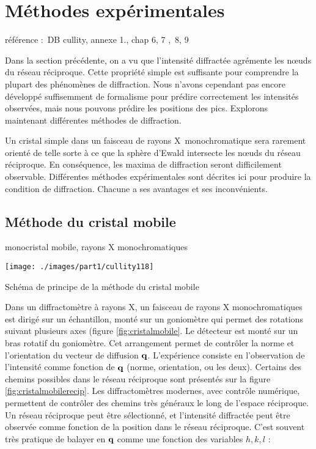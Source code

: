 \chapter{Méthodes expérimentales}

référence : DB cullity, annexe 1., chap 6, 7 , 8, 9

Dans la section précédente, on a vu que l'intensité diffractée agrémente les nœuds du réseau réciproque. Cette propriété simple est suffisante pour comprendre la plupart des phénomènes de diffraction.
Nous n'avons cependant pas encore développé suffisemment de formalisme pour prédire correctement les intensités observées, mais nous pouvons prédire les positions des pics. Explorons maintenant différentes méthodes de diffraction.

Un cristal simple dans un faisceau de rayons X monochromatique sera rarement orienté de telle sorte à ce que la sphère d'Ewald intersecte les nœuds du réseau réciproque. En conséquence, les maxima de diffraction seront difficilement observable. Différentes méthodes expérimentales sont décrites ici pour produire la condition de diffraction. Chacune a ses avantages et ses inconvénients.

\section{Méthode du cristal mobile}
monocristal mobile, rayons X monochromatiques

\begin{marginfigure}
    \texttt{[image: ./images/part1/cullity118]}
    \caption{Schéma de principe de la méthode du cristal mobile}
    \label{fig:cristalmobile}
\end{marginfigure}

Dans un diffractomètre à rayons X, un faisceau de rayons X monochromatiques est dirigé sur un échantillon, monté sur un goniomètre qui permet des rotations suivant plusieurs axes (figure \ref{fig:cristalmobile}. Le détecteur est monté sur un bras rotatif du goniomètre. Cet arrangement permet de contrôler la norme et l'orientation du vecteur de diffusion $\mathbf{q}$. L'expérience consiste en l'observation de l'intensité comme fonction de $\mathbf{q}$ (norme, orientation, ou les deux). Certains des chemins possibles dans le réseau réciproque sont présentés sur la figure \ref{fig:cristalmobilerecip}. Les diffractomètres modernes, avec contrôle numérique, permettent de contrôler des chemins très généraux le long de l'espace réciproque.
Un réseau réciproque peut être sélectionné, et l'intensité diffractée peut être observée comme fonction de la position dans le réseau réciproque. C'est souvent très pratique de balayer en $\mathbf{q}$ comme une fonction des variables $h,k,l$ :

